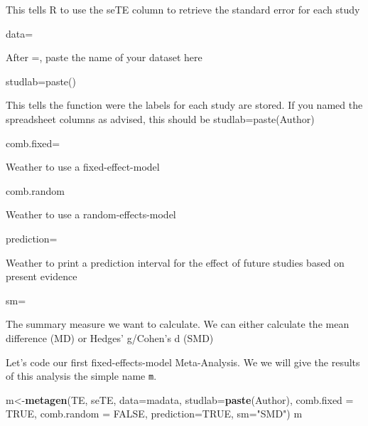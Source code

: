 \documentclass[]{book}
\newenvironment{Shaded}{\begin{snugshade}}{\end{snugshade}}
\newcommand{\DataTypeTok}[1]{\textcolor[rgb]{0.13,0.29,0.53}{#1}}
\newcommand{\KeywordTok}[1]{\textcolor[rgb]{0.13,0.29,0.53}{\textbf{#1}}}
\newcommand{\NormalTok}[1]{#1}
\newcommand{\OtherTok}[1]{\textcolor[rgb]{0.56,0.35,0.01}{#1}}
\newcommand{\StringTok}[1]{\textcolor[rgb]{0.31,0.60,0.02}{#1}}
\begin{document}
This tells R to use the seTE column to retrieve the standard error for each study

data=

After =, paste the name of your dataset here

studlab=paste()

This tells the function were the labels for each study are stored. If you named the spreadsheet columns as advised, this should be studlab=paste(Author)

comb.fixed=

Weather to use a fixed-effect-model

comb.random

Weather to use a random-effects-model

prediction=

Weather to print a prediction interval for the effect of future studies based on present evidence

sm=

The summary measure we want to calculate. We can either calculate the mean difference (MD) or Hedges' g/Cohen's d (SMD)

Let's code our first fixed-effects-model Meta-Analysis. We we will give the results of this analysis the simple name \texttt{m}.

\begin{Shaded}
\begin{Highlighting}[]
\NormalTok{m<-}\KeywordTok{metagen}\NormalTok{(TE,}
\NormalTok{        seTE,}
        \DataTypeTok{data=}\NormalTok{madata,}
        \DataTypeTok{studlab=}\KeywordTok{paste}\NormalTok{(Author),}
        \DataTypeTok{comb.fixed =} \OtherTok{TRUE}\NormalTok{,}
        \DataTypeTok{comb.random =} \OtherTok{FALSE}\NormalTok{,}
        \DataTypeTok{prediction=}\OtherTok{TRUE}\NormalTok{,}
        \DataTypeTok{sm=}\StringTok{"SMD"}\NormalTok{)}
\NormalTok{m}
\end{Highlighting}
\end{Shaded}
\end{document}
